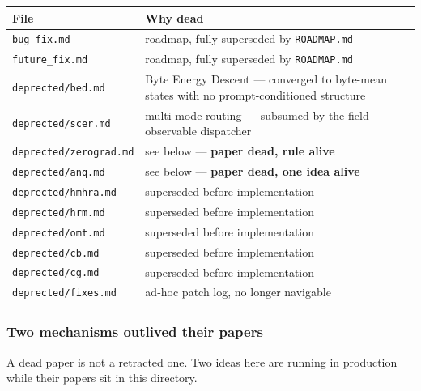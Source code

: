 \documentclass[
  11pt,
  a4paper,
]{article}
\begin{document}
\begin{longtable}[]{@{}
  >{\raggedright\arraybackslash}p{}
  >{\raggedright\arraybackslash}p{}@{}}
\toprule\noalign{}
\begin{minipage}[b]{\linewidth}\raggedright
File
\end{minipage} & \begin{minipage}[b]{\linewidth}\raggedright
Why dead
\end{minipage} \\
\midrule\noalign{}
\endhead
\bottomrule\noalign{}
\endlastfoot
\texttt{bug\_fix.md} & roadmap, fully superseded by
\texttt{ROADMAP.md} \\
\texttt{future\_fix.md} & roadmap, fully superseded by
\texttt{ROADMAP.md} \\
\texttt{deprected/bed.md} & Byte Energy Descent --- converged to
byte-mean states with no prompt-conditioned structure \\
\texttt{deprected/scer.md} & multi-mode routing --- subsumed by the
field-observable dispatcher \\
\texttt{deprected/zerograd.md} & see below --- \textbf{paper dead, rule
alive} \\
\texttt{deprected/anq.md} & see below --- \textbf{paper dead, one idea
alive} \\
\texttt{deprected/hmhra.md} & superseded before implementation \\
\texttt{deprected/hrm.md} & superseded before implementation \\
\texttt{deprected/omt.md} & superseded before implementation \\
\texttt{deprected/cb.md} & superseded before implementation \\
\texttt{deprected/cg.md} & superseded before implementation \\
\texttt{deprected/fixes.md} & ad-hoc patch log, no longer navigable \\
\end{longtable}

\subsubsection{Two mechanisms outlived their
papers}\label{two-mechanisms-outlived-their-papers}

A dead paper is not a retracted one. Two ideas here are running in
production while their papers sit in this directory.
\end{document}
